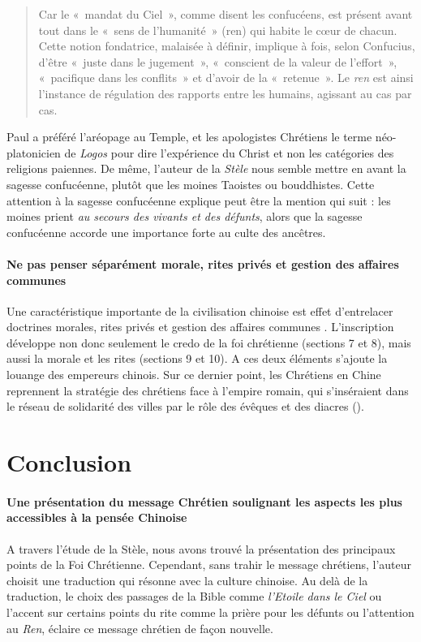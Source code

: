  \begin{quote}
     Car le « mandat du Ciel », comme disent les confucéens, est présent avant tout dans le « sens de l’humanité » (ren) qui habite le cœur de chacun. Cette notion fondatrice, malaisée à définir, implique à fois, selon Confucius, d’être « juste dans le jugement », « conscient de la valeur de l’effort », « pacifique dans les conflits » et d’avoir de la « retenue ». Le \textit{ren} est ainsi l’instance de régulation des rapports entre les humains, agissant au cas par cas.

\cite[p. 122]{PolDroit:voyage}  
 \end{quote}
 Paul a préféré  l'aréopage au Temple, et les apologistes Chrétiens le terme néo-platonicien de  \textit{Logos} pour dire l'expérience du Christ et non les catégories des religions paiennes. De même, l'auteur de la \textit{Stèle} nous semble mettre en avant la sagesse confucéenne, plutôt que les moines Taoistes ou bouddhistes. Cette attention à la sagesse confucéenne explique peut être  la mention qui suit : les moines prient \textit{au secours des vivants et des défunts}, alors que la sagesse confucéenne accorde une importance forte au culte des ancêtres.
 
 

 
 
  
\paragraph{Ne pas penser séparément morale, rites privés et gestion des affaires communes} Une caractéristique importante de la civilisation chinoise est effet d’entrelacer doctrines morales, rites privés et gestion des affaires communes
\cite[p. 120]{PolDroit:voyage}. L'inscription développe non donc seulement le credo de la foi chrétienne (sections 7 et 8), mais aussi la morale et les rites (sections 9 et 10). A ces deux éléments s'ajoute la louange des empereurs chinois. Sur ce dernier point, les Chrétiens en Chine reprennent  la stratégie des chrétiens face à l'empire romain, qui s'inséraient dans le réseau de solidarité des villes par le rôle des évêques et des diacres (\cite{Baslez:MondeDevnuChretien}).


\section{Conclusion}

\paragraph{Une présentation du message Chrétien soulignant les aspects les plus accessibles à la pensée Chinoise} A travers l'étude de la Stèle, nous avons trouvé la présentation des principaux points de la Foi Chrétienne. Cependant, sans trahir le message chrétiens, l'auteur choisit une traduction qui résonne avec la culture chinoise. Au delà de la traduction, le choix des passages de la Bible comme \textit{l'Etoile dans le Ciel} ou l'accent sur certains points du rite comme la prière pour les défunts ou l'attention au \textit{Ren}, éclaire ce message chrétien de façon nouvelle. 
 
